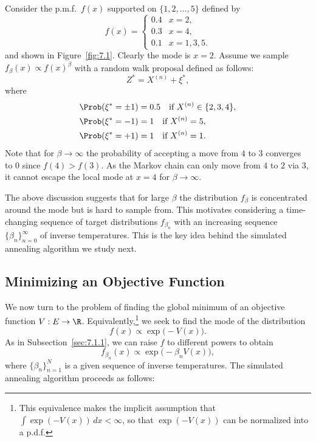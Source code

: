 \begin{example}
\label{ex:7.3}
Consider the p.m.f.\ $f(x)$ supported on $\{1, 2, \ldots, 5\}$ defined by
\[
  f(x) =
  \begin{cases}
    0.4 & x = 2, \\
    0.3 & x = 4, \\
    0.1 & x = 1, 3, 5.
  \end{cases}
\]
and shown in Figure~\ref{fig:7.1}. Clearly the mode is $x = 2$. Assume we sample
$f_\beta(x) \propto f(x)^\beta$ with a random walk proposal defined as follows:
\[
  Z^* = X^{(n)} + \xi^*,
\]
where
\begin{align*}
  \Prob(\xi^* = \pm 1) &= 0.5 \quad \text{if } X^{(n)} \in \{2, 3, 4\},\\
  \Prob(\xi^* = -1)    &= 1   \quad \text{if } X^{(n)} = 5,\\
  \Prob(\xi^* = +1)    &= 1   \quad \text{if } X^{(n)} = 1.
\end{align*}
Note that for $\beta \to \infty$ the probability of accepting a move from $4$ to $3$ converges
to $0$ since $f(4) > f(3)$. As the Markov chain can only move from $4$ to $2$ via $3$, it
cannot escape the local mode at $x = 4$ for $\beta \to \infty$.
\end{example}

The above discussion suggests that for large $\beta$ the distribution $f_\beta$ is concentrated
around the mode but is hard to sample from. This motivates considering a time-changing sequence
of target distributions $f_{\beta_n}$ with an increasing sequence $\{\beta_n\}_{n=0}^\infty$ of
inverse temperatures. This is the key idea behind the simulated annealing algorithm we study next.

\subsection{Minimizing an Objective Function}
\label{sec:7.1.2}

We now turn to the problem of finding the global minimum of an objective function
$V : E \to \R$. Equivalently,\footnote{This equivalence makes the implicit assumption that
$\int \exp(-V(x))\, dx < \infty$, so that $\exp(-V(x))$ can be normalized into a p.d.f.}
we seek to find the mode of the distribution
\[
  f(x) \propto \exp\!\bigl(-V(x)\bigr).
\]
As in Subsection~\ref{sec:7.1.1}, we can raise $f$ to different powers to obtain
\[
  f_{\beta_n}(x) \propto \exp\!\bigl(-\beta_n V(x)\bigr),
\]
where $\{\beta_n\}_{n=1}^N$ is a given sequence of inverse temperatures. The simulated annealing
algorithm proceeds as follows:

